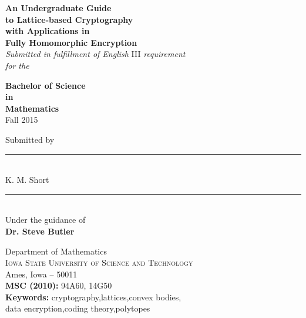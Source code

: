 \begin{titlepage}

\begin{center}

\Large \textbf{An Undergraduate Guide \\ to Lattice-based Cryptography \\ with Applications in \\ Fully Homomorphic Encryption}\\[0.50in]

       
    \small \emph{Submitted in fulfillment of English} III \emph{requirement}\\[0.2in]
    \small \emph{for the}
	\vspace{0.2in}

       \normalsize {\textbf{Bachelor of Science \\in\\ Mathematics}}\\[0.3in]
       
    	Fall 2015 
    	\vspace{0.45in}


\normalsize Submitted by \\
\medskip
\rule{40mm}{0.1pt} \\
\vspace{0.05in} 
K. M. Short \\
\vspace{.05in}
\rule{40mm}{0.1pt} \\

\vspace{0.1in}
Under the guidance of\\
{\textbf{Dr. Steve Butler}}\\[0.3in]

\vfill

\Large{Department of Mathematics}\\
\normalsize
\textsc{Iowa State University of Science and Technology}\\ 
Ames, Iowa -- 50011 \\
\vspace{0.4cm}
\textrm{\textbf{MSC (2010):} 94A60, 14G50} \\
\textrm{\textbf{Keywords:} cryptography,lattices,convex bodies, \\ data encryption,coding theory,polytopes}
\end{center}

\end{titlepage}
